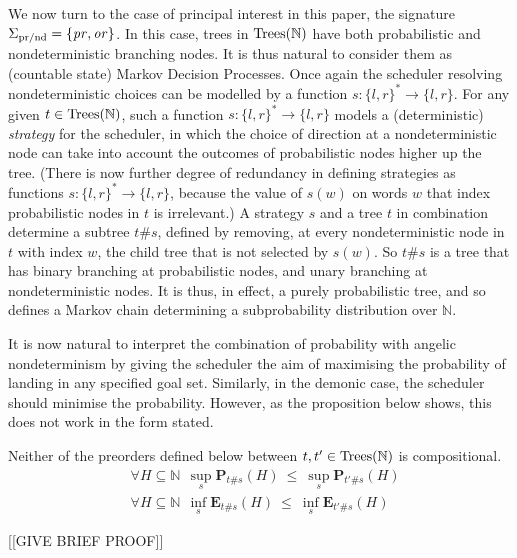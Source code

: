 We now turn to the case of principal interest in this paper, the signature $\Sigma_{\text{pr/nd}} = \{\operatorname{\mathit{pr}},\operatorname{\mathit{or}}\}$.
In this case, trees in $\textnormal{Trees}(\mathbb{N})$ have both probabilistic and nondeterministic branching nodes.
It is thus natural to consider them as (countable state) Markov Decision Processes. Once again the 
scheduler resolving nondeterministic
choices can be modelled by a 
function $s: \{l,r\}^* \to \{l,r\}$. For any given $t \in \textnormal{Trees}(\mathbb{N})$, such a function
$s: \{l,r\}^* \to \{l,r\}$ models a (deterministic) \emph{strategy} for the scheduler, in which the choice of direction at a nondeterministic node  
can take into account the outcomes of probabilistic nodes higher up the tree.
(There is now further degree of redundancy in defining strategies as functions $s: \{l,r\}^* \to \{l,r\}$, because the value of $s(w)$ on words $w$ that index 
probabilistic nodes in $t$ is irrelevant.) A strategy $s$ and a tree $t$ in combination determine a subtree $t\#s$, defined by 
removing, at every nondeterministic node in $t$ with index $w$, the child tree that is not selected by $s(w)$. So $t\#s$ is a tree that has binary branching at probabilistic nodes, and unary branching at nondeterministic nodes. It is thus, in effect, a purely probabilistic tree, and so defines a Markov chain determining a subprobability distribution over $\mathbb{N}$. 

It is now natural to interpret the combination of probability with angelic nondeterminism 
by giving the scheduler the aim of maximising the probability of landing in any specified goal set. Similarly, in the demonic case, the scheduler should minimise the probability. However, as the proposition below shows, 
this does not work in the form stated. 
\begin{aproposition}
Neither of the preorders defined below between $t,t' \in \textnormal{Trees}(\mathbb{N})$ is compositional.
\begin{align*}
& \forall H \subseteq \mathbb{N}  ~~ \sup_s  \mathbf{P}_{t\#s} (H)~ \leq~ \sup_s \mathbf{P}_{t'\#s} (H)
\\
& \forall H \subseteq \mathbb{N}  ~~ \inf_s  \mathbf{E}_{t\#s} (H)~ \leq~ \inf_s \mathbf{E}_{t'\#s} (H)
\end{align*}
\end{aproposition}

[[GIVE BRIEF PROOF]]

